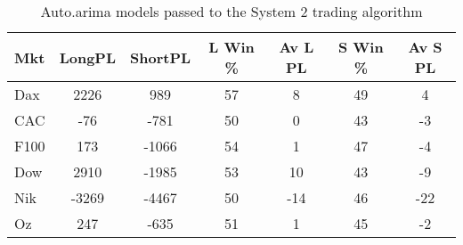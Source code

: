 \begin{table}[ht]
\centering
\caption[Sysytem 1 and auto.arima models.]{Auto.arima models passed to the System 2 trading algorithm} 
\label{tab:chp_ts:arima2}
\begin{tabular}{lcccccc}
  \toprule Mkt & LongPL & ShortPL & L Win \% & Av L PL & S Win \% & Av S PL \\ 
  \midrule Dax & 2226 & 989 & 57 & 8 & 49 & 4 \\ 
  CAC & -76 & -781 & 50 & 0 & 43 & -3 \\ 
  F100 & 173 & -1066 & 54 & 1 & 47 & -4 \\ 
  Dow & 2910 & -1985 & 53 & 10 & 43 & -9 \\ 
  Nik & -3269 & -4467 & 50 & -14 & 46 & -22 \\ 
  Oz & 247 & -635 & 51 & 1 & 45 & -2 \\ 
   \bottomrule \end{tabular}
\end{table}
